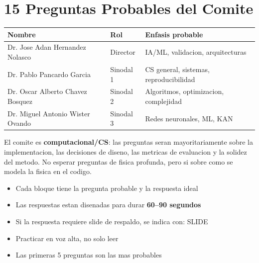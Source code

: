 \section{15 Preguntas Probables del Comite}

\begin{tcolorbox}[colback=ujatblue!10, colframe=ujatblue,
  title={\bfseries Perfil del Comite Evaluador}, coltitle=white, breakable]
\begin{tabular}{@{}lll@{}}
\toprule
\textbf{Nombre} & \textbf{Rol} & \textbf{Enfasis probable} \\
\midrule
Dr. Jose Adan Hernandez Nolasco & Director   & IA/ML, validacion, arquitecturas \\
Dr. Pablo Pancardo Garcia       & Sinodal 1  & CS general, sistemas, reproducibilidad \\
Dr. Oscar Alberto Chavez Bosquez & Sinodal 2 & Algoritmos, optimizacion, complejidad \\
Dr. Miguel Antonio Wister Ovando & Sinodal 3 & Redes neuronales, ML, KAN \\
\bottomrule
\end{tabular}

\vspace{6pt}
El comite es \textbf{computacional/CS}: las preguntas seran mayoritariamente sobre
la implementacion, las decisiones de diseno, las metricas de evaluacion y la
solidez del metodo. No esperar preguntas de fisica profunda, pero si sobre
como se modela la fisica en el codigo.
\end{tcolorbox}

\vspace{12pt}

\begin{tcolorbox}[colback=slidetip!30, colframe=ujatpurp,
  title={\bfseries Como usar esta seccion}, coltitle=white]
\begin{itemize}
  \item Cada bloque tiene la pregunta probable y la respuesta ideal
  \item Las respuestas estan disenadas para durar \textbf{60--90 segundos}
  \item Si la respuesta requiere slide de respaldo, se indica con: \colorbox{ujatred!20}{SLIDE}
  \item Practicar en voz alta, no solo leer
  \item Las primeras 5 preguntas son las mas probables
\end{itemize}
\end{tcolorbox}

